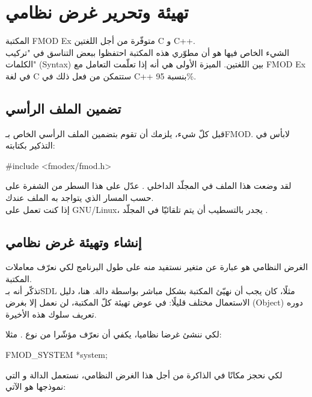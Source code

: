 \section{تهيئة وتحرير غرض نظامي}

المكتبة
\textenglish{FMOD Ex}
متوفّرة من أجل اللغتين
\textenglish{C}
و
\textenglish{C++}.\\
الشيء الخاص فيها هو أن مطوّري هذه المكتبة احتفظوا ببعض التناسق في "تركيب الكلمات"
(\textenglish{Syntax})
بين اللغتين. الميزة الأولى هي أنه إذا تعلّمت التعامل مع
\textenglish{FMOD Ex}
في لغة \textenglish{C}
ستتمكن من فعل ذلك في \textenglish{C++}
بنسبة 95\%.

\subsection{تضمين الملف الرأسي}

قبل كلّ شيء، يلزمك أن تقوم بتضمين الملف الرأسي الخاص بـ\textenglish{FMOD}.
 لابأس في التذكير بكتابته:

\begin{Csource}
#include <fmodex/fmod.h>
\end{Csource}

لقد وضعت هذا الملف في المجلّد الداخلي
.
عدّل على هذا السطر من الشفرة على حسب المسار الذي يتواجد به الملف عندك.\\
إذا كنت تعمل على
\mbox{\textenglish{GNU/Linux}}،
 يجدر بالتسطيب أن يتم تلقائيّا في المجلّد
.

\subsection{إنشاء وتهيئة غرض نظامي}

الغرض النظامي هو عبارة عن متغير نستفيد منه على طول البرنامج لكي نعرّف معاملات المكتبة.\\
تذكّر أنه بـ\textenglish{SDL}
مثلًا، كان يجب أن نهيّئ المكتبة بشكل مباشر بواسطة دالة. هنا، دليل الاستعمال مختلف قليلًا: في عوض تهيئة كلّ المكتبة، لن نعمل إلا بغرض
(\textenglish{Object})
دوره تعريف سلوك هذه الأخيرة.

لكي ننشئ غرضا نظاميا، يكفي أن نعرّف مؤشّرا من نوع
.
مثلا:

\begin{Csource}
FMOD_SYSTEM *system;
\end{Csource}

لكي نحجز مكانًا في الذاكرة من أجل هذا الغرض النظامي، نستعمل الدالة
و التي نموذجها هو الآتي:

